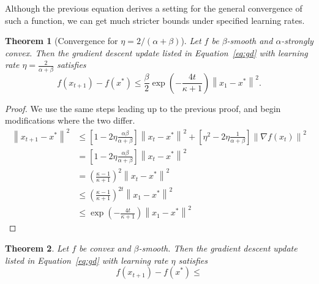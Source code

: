 \documentclass{article}
\newcommand{\norm}[1]{\left\| #1 \right\| }
\newtheorem{theorem}{Theorem}
\theoremstyle{definition}
\begin{document}
Although the previous equation derives a setting for the general convergence of
such a function, we can get much stricter bounds under specified learning rates.

\begin{theorem}[Convergence for $\eta = 2 / (\alpha + \beta)$]
    Let $f$ be $\beta$-smooth and $\alpha$-strongly convex. Then the
    gradient descent update listed in Equation~\ref{eq:gd} with learning rate
    $\eta = \frac{2}{\alpha + \beta} $ satisfies
    \begin{equation}
        f(x_{t+1}) - f(x^*) \leq \frac{\beta}{2} \exp \left( - \frac{4t}{\kappa
        + 1} \right) \norm{x_1 - x^*}^2.
    \end{equation}
\end{theorem}

\begin{proof}
    We use the same steps leading up to the previous proof, and begin
    modifications where the two differ.
    \begin{equation}
        \begin{aligned}
            \norm{x_{t + 1} - x^*}^2 
            &\leq \left[ 1 - 2\eta \frac{\alpha \beta}{\alpha + \beta}
            \right]\norm{x_t - x^*}^2 + \left[  \eta^2  - 2\eta\frac{1}{\alpha +
            \beta} \right]\norm{\nabla f(x_t)}^2\\
            &= \left[ 1 - 2\eta \frac{\alpha \beta}{\alpha + \beta}
            \right]\norm{x_t - x^*}^2 \\
            &= {\left( \frac{\kappa - 1}{\kappa + 1} 
            \right)}^2\norm{x_t - x^*}^2 \\
            &\leq {\left( \frac{\kappa - 1}{\kappa + 1} 
            \right)}^{2t}\norm{x_1 - x^*}^2 \\
            &\leq \exp \left( - \frac{4t}{\kappa
        + 1} \right) \norm{x_1 - x^*}^2
        \end{aligned}
    \end{equation}
\end{proof}

\begin{theorem}
    Let $f$ be convex and $\beta$-smooth. Then the
    gradient descent update listed in Equation~\ref{eq:gd} with learning rate
    $\eta$ satisfies
    \begin{equation}
        f(x_{t+1}) - f(x^*) \leq 
    \end{equation}
\end{theorem}
\end{document}
